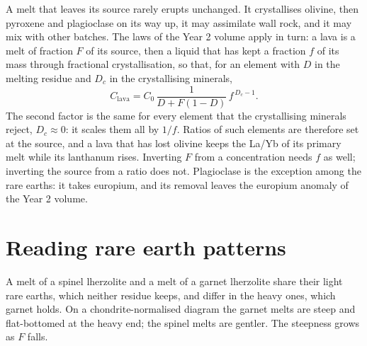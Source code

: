 A melt that leaves its source rarely erupts unchanged. It crystallises
olivine, then pyroxene and plagioclase on its way up, it may assimilate wall
rock, and it may mix with other batches. The laws of the Year 2 volume apply
in turn: a lava is a melt of fraction $F$ of its source, then a liquid that
has kept a fraction $f$ of its mass through fractional crystallisation, so
that, for an element with $D$ in the melting residue and $D_c$ in the
crystallising minerals,
\[
C_{\text{lava}} = C_0\,\frac{1}{D + F(1 - D)}\,f^{\,D_c - 1}.
\]
The second factor is the same for every element that the crystallising
minerals reject, $D_c \approx 0$: it scales them all by $1/f$. Ratios of such
elements are therefore set at the source, and a lava that has lost olivine
keeps the La/Yb of its primary melt while its lanthanum rises. Inverting $F$
from a concentration needs $f$ as well; inverting the source from a ratio does
not. Plagioclase is the exception among the rare earths: it takes europium,
and its removal leaves the europium anomaly of the Year 2 volume.

\section{Reading rare earth patterns}\label{sec:b3:trace-element-modelling:patterns}

A melt of a spinel lherzolite and a melt of a garnet lherzolite share their
light rare earths, which neither residue keeps, and differ in the heavy ones,
which garnet holds. On a chondrite-normalised diagram the garnet melts are
steep and flat-bottomed at the heavy end; the spinel melts are gentler. The
steepness grows as $F$ falls.

